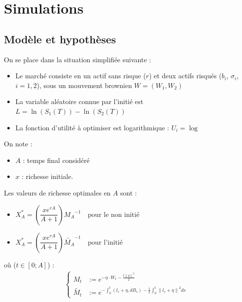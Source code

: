 \documentclass[french]{beamer}
\begin{document}
\section{Simulations}
\subsection{Modèle et hypothèses}
\begin{frame}
On se place dans la situation simplifiée suivante : 
\begin{itemize}
	\item Le marché consiste en un actif sans risque ($r$) et deux actifs risqués ($b_{i}$, $\sigma_{i}$, $i = 1, 2$), sous un mouvement brownien $W = \left( W_{1}, W_{2} \right)$
	\item La variable aléatoire connue par l'initié est $L = \ln\left(S_{1} \left(T \right) \right) - \ln\left( S_{2} \left( T \right) \right)$
	\item La fonction d'utilité à optimiser est logarithmique : $U_{i} = \log$
\end{itemize}
On note : 
\begin{itemize}
	\item $A$ : temps final considéré
	\item $x$ : richesse initiale.
\end{itemize}
\end{frame}

\begin{frame}
Les valeurs de richesse optimales en $A$ sont : 
\begin{itemize}
	\item $X_{A}^{*} = \left( \dfrac{x e^{rA}}{A + 1} \right) {M_{A}}^{-1} \quad \text{pour le non initié}$
	\item $X_{A}^{*} = \left( \dfrac{x e^{rA}}{A + 1} \right) {\tilde{M_{A}}}^{-1} \quad \text{pour l'initié}$
\end{itemize}
où ($t \in \left[0; A \right]$) :
\begin{displaymath}
	\begin{split}
	\left\lbrace
		\begin{array}{ll}
		M_{t} &:= e^{- \eta \cdot W_{t} - \frac{t {\| \eta \|}^{2}}{2}} \\
		\tilde{M_{t}} &:= e^{- \int_{0}^{t} \left( l_{s} + \eta, dB_{s} \right) - \frac{1}{2} \int_{0}^{t} {\| l_{s} + \eta \|}^{2} ds}
		\end{array}\right.	
	\end{split}
\end{displaymath}
\end{frame}
\end{document}
